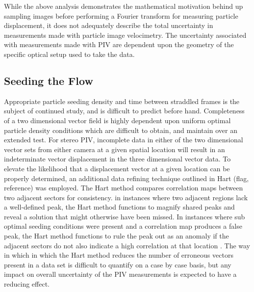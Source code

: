 

While the above analysis demonstrates the mathematical motivation behind up 
sampling images before performing a Fourier transform for measuring particle 
displacement, it does not adequately describe the total uncertainty in 
measurements made with particle image velocimetry. The uncertainty associated 
with measurements made with PIV are dependent upon the geometry of the specific 
optical setup used to take the data.


\subsection{Seeding the Flow}

Appropriate particle seeding density and time between straddled frames is the
subject of continued study, and is difficult to predict before hand. 
Completeness of a two dimensional vector field is highly dependent upon 
uniform
optimal particle density conditions which are difficult to obtain, and maintain
over an extended test. For stereo PIV, incomplete data in either of the two 
dimensional vector 
sets from either camera at a given spatial location will result in an 
indeterminate vector displacement in the three dimensional vector data. To 
elevate the likelihood that a displacement vector at a given location can be 
properly determined, an additional data refining technique outlined in Hart 
(flag, reference) was employed. The Hart method compares correlation maps 
between two adjacent sectors for consistency. in instances where two adjacent 
regions lack a well-defined peak, the Hart method functions to magnify shared 
peaks and reveal a solution that might otherwise have been missed. In instances 
where sub optimal seeding conditions were present and a correlation map 
produces a false peak, the Hart method functions to rule the peak out as an 
anomaly if the adjacent sectors do not also indicate a high correlation at that 
location \cite{hart1998}. The way in which in which the Hart method reduces the 
number of erroneous vectors present in a data set is difficult to quantify on a 
case by case basis, but any impact on overall uncertainty of the PIV 
measurements is expected to have a reducing effect.